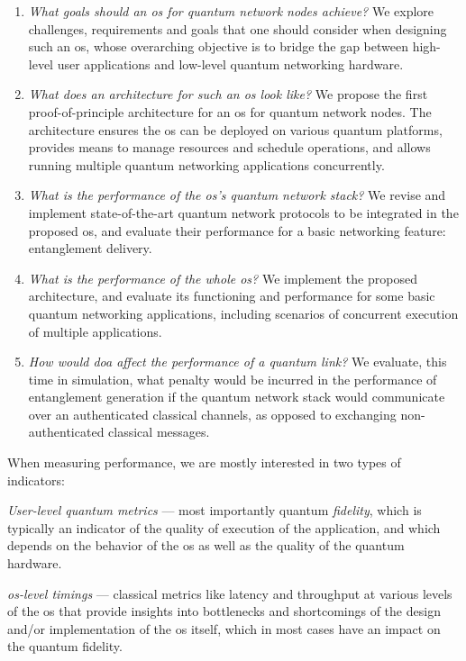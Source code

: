 \begin{enumerate}[label={Q\arabic*.}]
    \item \emph{What goals should an \acrshort{os} for quantum network nodes achieve?} We explore
          challenges, requirements and goals that one should consider when designing such an
          \acrshort{os}, whose overarching objective is to bridge the gap between high-level user
          applications and low-level quantum networking hardware.
    \item \emph{What does an architecture for such an \acrshort{os} look like?} We propose the first
          proof-of-principle architecture for an \acrshort{os} for quantum network nodes. The
          architecture ensures the \acrshort{os} can be deployed on various quantum platforms,
          provides means to manage resources and schedule operations, and allows running multiple
          quantum networking applications concurrently.
    \item \emph{What is the performance of the \acrshort{os}'s quantum network stack?} We revise and
          implement state-of-the-art quantum network protocols to be integrated in the proposed
          \acrshort{os}, and evaluate their performance for a basic networking feature: entanglement
          delivery.
    \item \emph{What is the performance of the whole \acrshort{os}?} We implement the proposed
          architecture, and evaluate its functioning and performance for some basic quantum
          networking applications, including scenarios of concurrent execution of multiple
          applications.
    \item \emph{How would \acrlong{doa} affect the performance of a quantum link?} We evaluate, this
          time in simulation, what penalty would be incurred in the performance of entanglement
          generation if the quantum network stack would communicate over an authenticated classical
          channels, as opposed to exchanging non-authenticated classical messages.
\end{enumerate}

When measuring performance, we are mostly interested in two types of indicators:
%
\begin{inlinelist}
    \item \emph{User-level quantum metrics} --- most importantly quantum \emph{fidelity}, which is
          typically an indicator of the quality of execution of the application, and which depends
          on the behavior of the \acrshort{os} as well as the quality of the quantum hardware.
    \item \emph{\acrshort{os}-level timings} --- classical metrics like latency and throughput at
          various levels of the \acrshort{os} that provide insights into bottlenecks and
          shortcomings of the design and/or implementation of the \acrshort{os} itself, which in
          most cases have an impact on the quantum fidelity.
\end{inlinelist}

